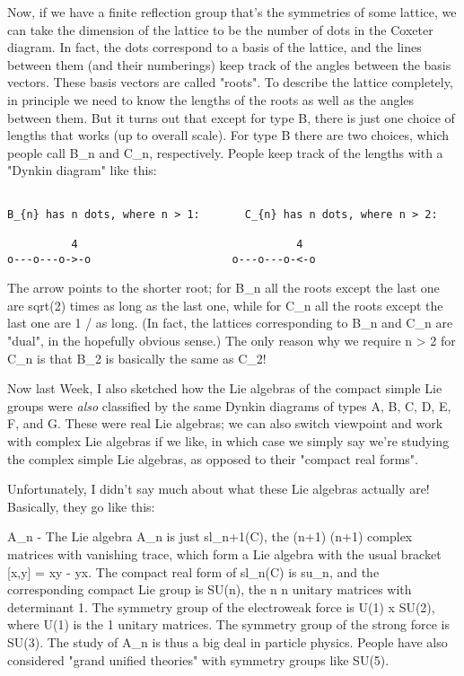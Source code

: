 Now, if we have a finite reflection group that's the symmetries of some
lattice, we can take the dimension of the lattice to be the number of
dots in the Coxeter diagram.  In fact, the dots correspond to a basis of
the lattice, and the lines between them (and their numberings) keep
track of the angles between the basis vectors.  These basis vectors are
called "roots".  To describe the lattice completely, in principle we
need to know the lengths of the roots as well as the angles between
them.  But it turns out that except for type B, there is just one choice
of lengths that works (up to overall scale).  For type B there are two
choices, which people call B_{n} and C_{n}, respectively.  People keep
track of the lengths with a "Dynkin diagram" like this:


\begin{verbatim}

B_{n} has n dots, where n > 1:       C_{n} has n dots, where n > 2:

          4                                  4
o---o---o->-o                      o---o---o-<-o
\end{verbatim}
    

The arrow points to the shorter root; for B_{n} all the roots
except the last one are sqrt(2) times as long as the last one, while
for C_{n} all the roots except the last one are 1 /  as
long.  (In fact, the lattices corresponding to B_{n} and
C_{n} are "dual", in the hopefully obvious sense.)  The only
reason why we require n > 2 for C_{n} is that B_{2} is
basically the same as C_{2}!

Now last Week, I also sketched how the Lie algebras of the compact
simple Lie groups were \emph{also} classified by the same Dynkin diagrams
of types A, B, C, D, E, F, and G.  These were real Lie algebras; we
can also switch viewpoint and work with complex Lie algebras if we
like, in which case we simply say we're studying the complex simple
Lie algebras, as opposed to their "compact real forms".

Unfortunately, I didn't say much about what these Lie algebras actually
are!  Basically, they go like this:

A_{n} - The Lie algebra A_{n} is just sl_{n+1}(C),
the (n+1) \times  (n+1) complex matrices with vanishing trace, which form a
Lie algebra with the usual bracket [x,y] = xy - yx.  The compact real
form of sl_{n}(C) is su_{n}, and the corresponding
compact Lie group is SU(n), the n \times  n unitary matrices with
determinant 1.  The symmetry group of the electroweak force is U(1) x
SU(2), where U(1) is the 1  unitary matrices.  The symmetry group
of the strong force is SU(3).  The study of A_{n} is thus a
big deal in particle physics.  People have also considered "grand
unified theories" with symmetry groups like SU(5).

